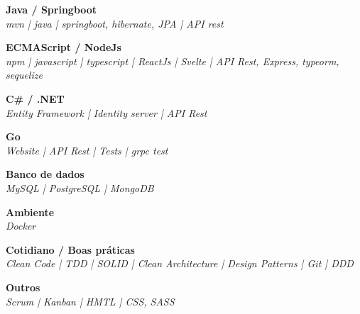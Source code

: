 \documentclass[12pt, a4paper]{article}
\begin{document}
\begin{multicols}{2}
	\begin{flushleft}
		\textbf{Java / Springboot}\\
		\textit{mvn | java | springboot, hibernate, JPA | API rest}\\
	\end{flushleft}
	\vfill
	\begin{flushleft}
		\textbf{ECMAScript / NodeJs}\\
		\textit{npm | javascript | typescript | ReactJs | Svelte | API Rest, Express, typeorm, sequelize}\\
	\end{flushleft}
\end{multicols}

\begin{multicols}{2}
	\begin{flushleft}
		\textbf{C\# / .NET}\\
		\textit{Entity Framework | Identity server | API Rest}\\
	\end{flushleft}
	\vfill
	\begin{flushleft}
		\textbf{Go}\\
		\textit{Website | API Rest | Tests | grpc test}\\
	\end{flushleft}
\end{multicols}

\begin{multicols}{2}
	\begin{flushleft}
		\textbf{Banco de dados}\\
		\textit{MySQL | PostgreSQL | MongoDB}\\
	\end{flushleft}
	\vfill
	\begin{flushleft}
		\textbf{Ambiente}\\
		\textit{Docker}\\
	\end{flushleft}
\end{multicols}

\begin{multicols}{2}
	\begin{flushleft}
		\textbf{Cotidiano / Boas práticas}\\
		\textit{Clean Code | TDD | SOLID | Clean Architecture | Design Patterns | Git | DDD}\\
	\end{flushleft}
	\vfill
	\begin{flushleft}
		\textbf{Outros}\\
		\textit{Scrum | Kanban | HMTL | CSS, SASS}\\
	\end{flushleft}
\end{multicols}
\end{document}
